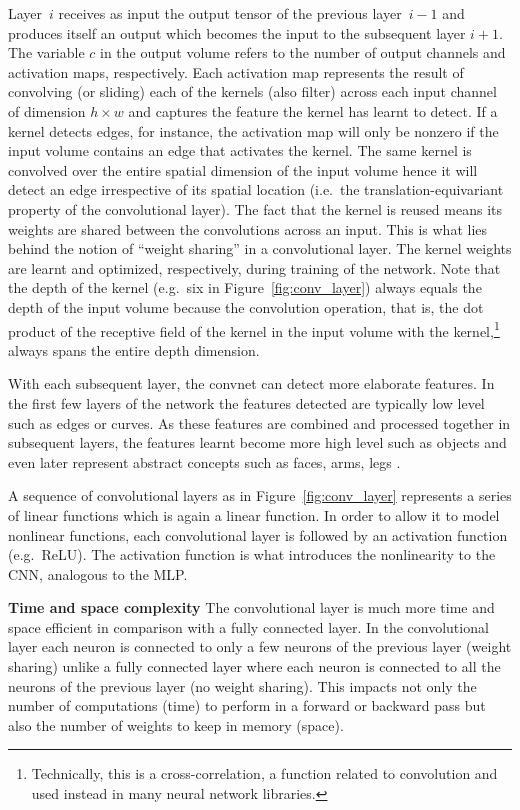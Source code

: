 \documentclass[a4paper,12pt]{report}
\begin{document}
Layer~$i$ receives as input the output tensor of the previous layer~$i-1$ and produces itself an output which becomes the input to the subsequent layer $i+1$. The variable $c$ in the output volume refers to the number of output channels and activation maps, respectively. Each activation map represents the result of convolving (or sliding) each of the kernels (also filter) across each input channel of dimension $h \times w$ and captures the feature the kernel has learnt to detect. If a kernel detects edges, for instance, the activation map will only be nonzero if the input volume contains an edge that activates the kernel. The same kernel is convolved over the entire spatial dimension of the input volume hence it will detect an edge irrespective of its spatial location (i.e.\ the translation-equivariant property of the convolutional layer). The fact that the kernel is reused means its weights are shared between the convolutions across an input. This is what lies behind the notion of ``weight sharing'' in a convolutional layer. The kernel weights are learnt and optimized, respectively, during training of the network. Note that the depth of the kernel (e.g.\ six in Figure~\ref{fig:conv_layer}) always equals the depth of the input volume because the convolution operation, that is, the dot product of the receptive field of the kernel in the input volume with the kernel,\footnote{Technically, this is a cross-correlation, a function related to convolution and used instead in many neural network libraries.} always spans the entire depth dimension.

With each subsequent layer, the convnet can detect more elaborate features. In the first few layers of the network the features detected are typically low level such as edges or curves. As these features are combined and processed together in subsequent layers, the features learnt become more high level such as objects and even later represent abstract concepts such as faces, arms, legs \cite{DeepVis}.

A sequence of convolutional layers as in Figure~\ref{fig:conv_layer} represents a series of linear functions which is again a linear function. In order to allow it to model nonlinear functions, each convolutional layer is followed by an activation function (e.g.\ ReLU). The activation function is what introduces the nonlinearity to the CNN, analogous to the MLP.

\textbf{Time and space complexity} The convolutional layer is much more time and space efficient in comparison with a fully connected layer. In the convolutional layer each neuron is connected to only a few neurons of the previous layer (weight sharing) unlike a fully connected layer where each neuron is connected to all the neurons of the previous layer (no weight sharing). This impacts not only the number of computations (time) to perform in a forward or backward pass but also the number of weights to keep in memory (space).
\end{document}
